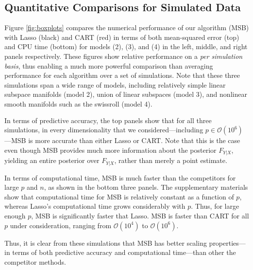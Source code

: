 \documentclass{article} %
\providecommand{\mc}[1]{\mathcal{#1}}
\begin{document}
\subsection{Quantitative Comparisons for Simulated Data} \label{sub:sim}

Figure \ref{fig:boxplots} compares the numerical performance of our algorithm (MSB) with Lasso (black) and CART (red) in terms of both mean-squared error (top) and CPU time (bottom) for models (2), (3), and (4) in the left, middle, and right panels respectively. These figures show relative performance on a \emph{per simulation basis}, thus enabling a much more powerful comparison than averaging performance for each algorithm over a set of simulations.  Note that these three simulations span a wide range of models, including relatively simple linear subspace manifolds (model 2), union of linear subspaces (model 3), and nonlinear smooth manifolds such as the swissroll (model 4).

In terms of predictive accuracy, the top panels show that for all three simulations,  in every dimensionality that we considered---including $p \in \mc{O}(10^6)$---MSB is more accurate than either Lasso or CART.  Note that this is the case even though MSB provides much more information about the posterior $F_{Y|X}$, yielding an entire posterior over $F_{Y|X}$, rather than merely a point estimate.

In terms of computational time, MSB is much faster than the competitors for large $p$ and $n$, as shown in the bottom three panels.  The supplementary materials show that computational time for MSB is relatively constant as a function of $p$, whereas Lasso's computational time grows considerably with $p$.  Thus, for large enough $p$, MSB is significantly faster that Lasso.  MSB is faster than CART for all $p$ under consideration, ranging from $\mc{O}(10^4)$ to $\mc{O}(10^6)$. 

Thus, it is clear from these simulations that MSB has better scaling properties---in terms of both predictive accuracy and computational time---than other the competitor methods. 
\end{document}
